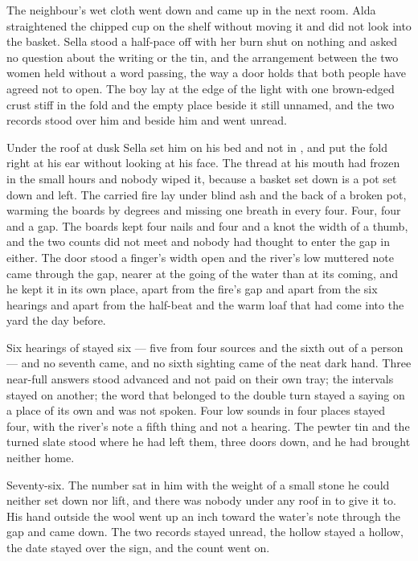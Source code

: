 The neighbour's wet cloth went down and came up in the next room. Alda straightened the chipped cup on the shelf without moving it and did not look into the basket. Sella stood a half-pace off with her burn shut on nothing and asked no question about the writing or the tin, and the arrangement between the two women held without a word passing, the way a door holds that both people have agreed not to open. The boy lay at the edge of the light with one brown-edged crust stiff in the fold and the empty place beside it still unnamed, and the two records stood over him and beside him and went unread.

\scenebreak

Under the  roof at dusk Sella set him on his bed and not in , and put the fold right at his ear without looking at his face. The thread at his mouth had frozen in the small hours and nobody wiped it, because a basket set down is a pot set down and left. The carried fire lay under blind ash and the back of a broken pot, warming the boards by degrees and missing one breath in every four. Four, four and a gap. The boards kept four nails and four and a knot the width of a thumb, and the two counts did not meet and nobody had thought to enter the gap in either. The door stood a finger's width open and the river's low muttered note came through the gap, nearer at the going of the water than at its coming, and he kept it in its own place, apart from the fire's gap and apart from the six hearings and apart from the half-beat and the warm loaf that had come into the yard the day before.

Six hearings of  stayed six — five from four sources and the sixth out of a person — and no seventh came, and no sixth sighting came of the neat dark hand. Three near-full answers stood advanced and not paid on their own tray; the intervals stayed on another; the word that belonged to the double turn stayed a saying on a place of its own and was not spoken. Four low sounds in four places stayed four, with the river's note a fifth thing and not a hearing. The pewter tin and the turned slate stood where he had left them, three doors down, and he had brought neither home.

Seventy-six. The number sat in him with the weight of a small stone he could neither set down nor lift, and there was nobody under any roof in  to give it to. His hand outside the wool went up an inch toward the water's note through the gap and came down. The two records stayed unread, the hollow stayed a hollow, the date stayed over the sign, and the count went on.

